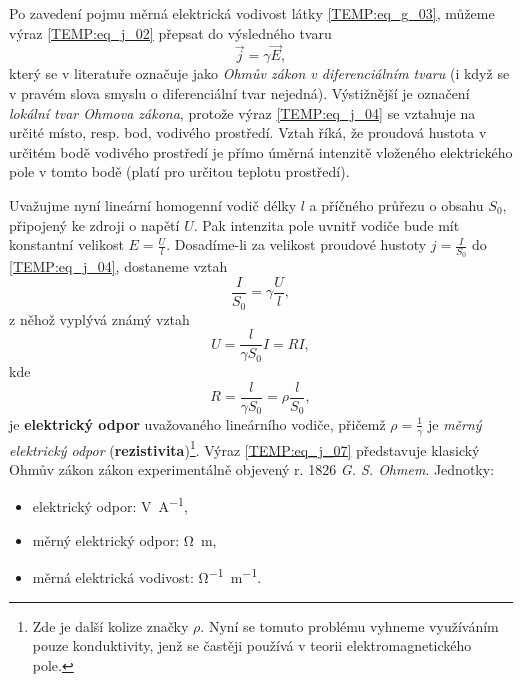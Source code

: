{      Po zavedení pojmu měrná elektrická vodivost látky \ref{TEMP:eq_g_03}, můžeme výraz
      \ref{TEMP:eq_j_02} přepsat do výsledného tvaru
      \begin{equation}\label{TEMP:eq_j_04}
        \vec{j} = \gamma\vec{E},
      \end{equation}              
      který se v literatuře označuje jako \emph{Ohmův zákon v diferenciálním tvaru} (i když se v
      pravém slova smyslu o diferenciální tvar nejedná). Výstižnější je označení \emph{lokální tvar
      Ohmova zákona}, protože výraz \ref{TEMP:eq_j_04} se vztahuje na určité místo, resp. bod,
      vodivého prostředí. Vztah říká, že proudová hustota v určitém bodě vodivého prostředí je
      přímo úměrná intenzitě vloženého elektrického pole v tomto bodě (platí pro určitou teplotu
      prostředí).
      
      Uvažujme nyní lineární homogenní vodič délky $l$ a příčného průřezu o obsahu $S_0$, připojený
      ke zdroji o napětí $U$. Pak intenzita pole uvnitř vodiče bude mít konstantní velikost
      $E=\frac{U}{l}$. Dosadíme-li za velikost proudové hustoty $j=\frac{I}{S_0}$ do
      \ref{TEMP:eq_j_04}, dostaneme vztah
      \begin{equation}\label{TEMP:eq_j_05}
        \frac{I}{S_0} = \gamma\frac{U}{l},
      \end{equation}        
      z něhož vyplývá známý vztah
      \begin{equation}\label{TEMP:eq_j_06}
        U = \frac{l}{\gamma S_0}I = RI,
      \end{equation}              
      kde
      \begin{equation}\label{TEMP:eq_j_07}
        R = \frac{l}{\gamma S_0} = \rho\frac{l}{S_0},
      \end{equation} 
      je \textbf{elektrický odpor} uvažovaného lineárního vodiče, přičemž $\rho = \frac{1}{\gamma}$
      je \emph{měrný elektrický odpor} (\textbf{rezistivita})\footnote{Zde je další kolize značky
      $\rho$. Nyní se tomuto problému vyhneme využíváním pouze konduktivity, jenž se častěji
      používá v teorii elektromagnetického pole.}. Výraz \ref{TEMP:eq_j_07} představuje klasický
      Ohmův zákon zákon experimentálně objevený r. 1826 \emph{G. S. Ohmem}. Jednotky:
      \begin{itemize}\addtolength{\itemsep}{-0.5\baselineskip}
        \item elektrický odpor: \si{V.A^{-1}},
        \item měrný elektrický odpor: \si{\ohm.m},
        \item měrná elektrická vodivost: \si{\ohm^{-1}.m^{-1}}.
      \end{itemize}

}
